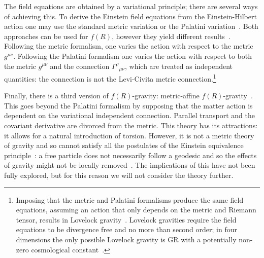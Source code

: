 \documentclass[aps,prd,amsfonts,amssymb,amsmath,nofootinbib,reprint,showpacs]{revtex4-1}
\begin{document}
The field equations are obtained by a variational principle; there are several ways of achieving this. To derive the Einstein field equations from the Einstein-Hilbert action one may use the standard metric variation or the Palatini variation~\cite{Misner1973}. Both approaches can be used for $f(R)$, however they yield different results~\cite{Sotiriou2010, DeFelice2010}. Following the metric formalism, one varies the action with respect to the metric $g^{\mu\nu}$. Following the Palatini formalism one varies the action with respect to both the metric $g^{\mu\nu}$ and the connection ${\Gamma^\rho}_{\mu\nu}$, which are treated as independent quantities: the connection is not the Levi-Civita metric connection.\footnote{Imposing that the metric and Palatini formalisms produce the same field equations, assuming an action that only depends on the metric and Riemann tensor, results in Lovelock gravity~\cite{Exirifard2008}. Lovelock gravities require the field equations to be divergence free and no more than second order; in four dimensions the only possible Lovelock gravity is GR with a potentially non-zero cosmological constant~\cite{Lovelock1970, Lovelock1971, Lovelock1972}.}

Finally, there is a third version of $f(R)$-gravity: metric-affine $f(R)$-gravity~\cite{Sotiriou2007, Sotiriou2007b}. This goes beyond the Palatini formalism by supposing that the matter action is dependent on the variational independent connection. Parallel transport and the covariant derivative are divorced from the metric. This theory has its attractions: it allows for a natural introduction of torsion. However, it is not a metric theory of gravity and so cannot satisfy all the postulates of the Einstein equivalence principle~\cite{Will2006}: a free particle does not necessarily follow a geodesic and so the effects of gravity might not be locally removed~\cite{Exirifard2008}. The implications of this have not been fully explored, but for this reason we will not consider the theory further.
\end{document}
